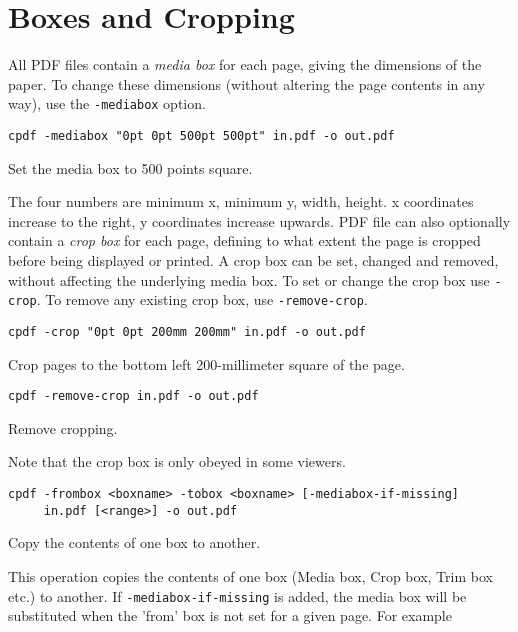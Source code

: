 \documentclass{book}
\begin{document}
  \section{Boxes and Cropping}
  All PDF files contain a \textit{media box} for each page, giving the
dimensions of the paper. To change these dimensions (without altering the page
contents in any way), use the \texttt{-mediabox} option.
  \begin{framed}
  \small\verb!cpdf -mediabox "0pt 0pt 500pt 500pt" in.pdf -o out.pdf!

  \vspace{2.5mm}
  \noindent Set the media box to 500 points square.
  \end{framed}
  \noindent The four numbers are minimum x, minimum y, width, height. x
coordinates increase to the right, y coordinates increase upwards.
  PDF file can also optionally contain a \textit{crop box} for each page,
defining to what extent the page is cropped before being displayed or printed.
A crop box can be set, changed and removed, without affecting the underlying
media box. To set or change the crop box use \texttt{-crop}. To remove any
existing crop box, use \texttt{-remove-crop}.
  \begin{framed}
  \small\verb!cpdf -crop "0pt 0pt 200mm 200mm" in.pdf -o out.pdf!

  \vspace{2.5mm}
  \noindent Crop pages to the bottom left 200-millimeter square of the page.

  \vspace{2.5mm}
  \verb!cpdf -remove-crop in.pdf -o out.pdf!
  
  \vspace{2.5mm}
  \noindent Remove cropping.
  \end{framed}

\noindent Note that the crop box is only obeyed in some viewers. 

  \begin{framed}
  \small\noindent\verb!cpdf -frombox <boxname> -tobox <boxname> [-mediabox-if-missing]! \\
  \noindent\verb!     in.pdf [<range>] -o out.pdf!

  \vspace{2.5mm}
  \noindent Copy the contents of one box to another.

  \end{framed}
  \noindent This operation copies the contents of one box (Media box, Crop box, Trim box etc.) to another. If \texttt{-mediabox-if-missing} is added, the media box will be substituted when the 'from' box is not set for a given page. For example
\end{document}
